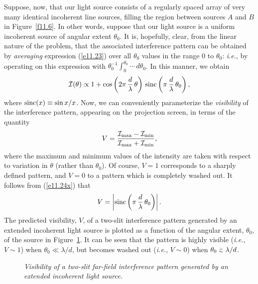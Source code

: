 Suppose, now, that our light source consists of a regularly spaced array of  very many identical incoherent line sources, filling the region
between sources $A$ and $B$ in Figure~\ref{f11.6}. In other words, suppose that our light source is a uniform incoherent source of
angular extent $\theta_0$. 
 It is, hopefully, clear, from the linear nature of the problem, that the associated interference pattern can be obtained
by {\em averaging}\/ expression (\ref{e11.23}) over all $\theta_0$ values in the range $0$ to $\theta_0$: 
{\em i.e.}, by operating on this expression with $\theta_0^{-1}\int_0^{\theta_0}\cdots\,d\theta_0$. In this manner,
we obtain
\begin{equation}\label{e11.24x}
{\cal I}(\theta) \propto 1 + \cos\left(2\pi\,\frac{d}{\lambda}\,\theta\right)\,{\rm sinc}\left(\pi\,\frac{d}{\lambda}\,\theta_0\right),
\end{equation}
where ${\rm sinc}(x)\equiv 
\sin x/x$. Now, we can conveniently parameterize  the {\em visibility}\/ of the interference pattern, appearing on the projection
screen, in terms of the quantity
\begin{equation}\label{e11.26xx}
V = \frac{{\cal I}_{\rm max} - {\cal I}_{\rm min}}{{\cal I}_{\rm max} + {\cal I}_{\rm min}},
\end{equation}
where the maximum and minimum values of the intensity are taken with respect to variation in $\theta$ (rather than $\theta_0$). Of course, $V=1$ corresponds to a sharply defined pattern, and $V=0$ to a pattern which is completely
washed out. It follows from (\ref{e11.24x}) that
\begin{equation}
V = \left|{\rm sinc}\left(\pi\,\frac{d}{\lambda}\,\theta_0\right)\right|.
\end{equation}
The predicted visibility, $V$, of a two-slit interference pattern generated by an extended incoherent light source is plotted as a function of the angular extent, $\theta_0$, of the  source 
in Figure~\ref{f11.7}. It can be seen that the pattern is highly visible ({\em i.e.}, $V\sim 1$) when $\theta_0\ll \lambda/d$, but
becomes washed out ({\em i.e.}, $V\sim 0$) when $\theta_0\stackrel {_{\normalsize>}}{_{\normalsize \sim}} \lambda/d$. 

\begin{figure}
\epsfysize=2.5in
\centerline{}
\caption{\em Visibility of a two-slit far-field interference pattern generated by an extended incoherent light source.}\label{f11.7}   
\end{figure}

